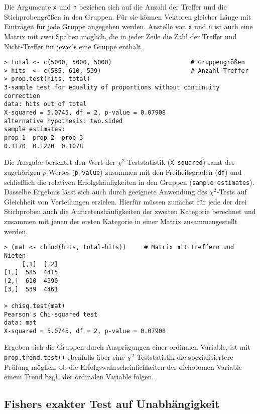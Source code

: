 Die Argumente \lstinline!x! und \lstinline!n! beziehen sich auf die Anzahl der Treffer und die Stichprobengrößen in den Gruppen. Für sie können Vektoren gleicher Länge mit Einträgen für jede Gruppe angegeben werden. Anstelle von \lstinline!x! und \lstinline!n! ist auch eine Matrix mit zwei Spalten möglich, die in jeder Zeile die Zahl der Treffer und Nicht-Treffer für jeweils eine Gruppe enthält.
\begin{lstlisting}
> total <- c(5000, 5000, 5000)                      # Gruppengrößen
> hits  <- c(585, 610, 539)                         # Anzahl Treffer
> prop.test(hits, total)
3-sample test for equality of proportions without continuity correction
data: hits out of total
X-squared = 5.0745, df = 2, p-value = 0.07908
alternative hypothesis: two.sided
sample estimates:
prop 1  prop 2  prop 3
0.1170  0.1220  0.1078
\end{lstlisting}

Die Ausgabe berichtet den Wert der $\chi^{2}$-Teststatistik (\lstinline!X-squared!) samt des zugehörigen $p$-Wertes (\lstinline!p-value!) zusammen mit den Freiheitsgraden (\lstinline!df!) und schließlich die relativen Erfolgshäufigkeiten in den Gruppen (\lstinline!sample estimates!). Dasselbe Ergebnis lässt sich auch durch geeignete Anwendung des $\chi^{2}$-Tests auf Gleichheit von Verteilungen erzielen. Hierfür müssen zunächst für jede der drei Stichproben auch die Auftretenshäufigkeiten der zweiten Kategorie berechnet und zusammen mit jenen der ersten Kategorie in einer Matrix zusammengestellt werden.
\begin{lstlisting}
> (mat <- cbind(hits, total-hits))     # Matrix mit Treffern und Nieten
     [,1]  [,2]
[1,]  585  4415
[2,]  610  4390
[3,]  539  4461

> chisq.test(mat)
Pearson's Chi-squared test
data: mat
X-squared = 5.0745, df = 2, p-value = 0.07908
\end{lstlisting}

Ergeben sich die Gruppen durch Ausprägungen einer ordinalen Variable, ist mit \lstinline!prop.trend.test()! ebenfalls über eine $\chi^{2}$-Teststatistik die spezialisiertere Prüfung möglich, ob die Erfolgswahrscheinlichkeiten der dichotomen Variable einem Trend bzgl.\ der ordinalen Variable folgen.

\subsection{Fishers exakter Test auf Unabhängigkeit}
\label{sec:fisherInd}

